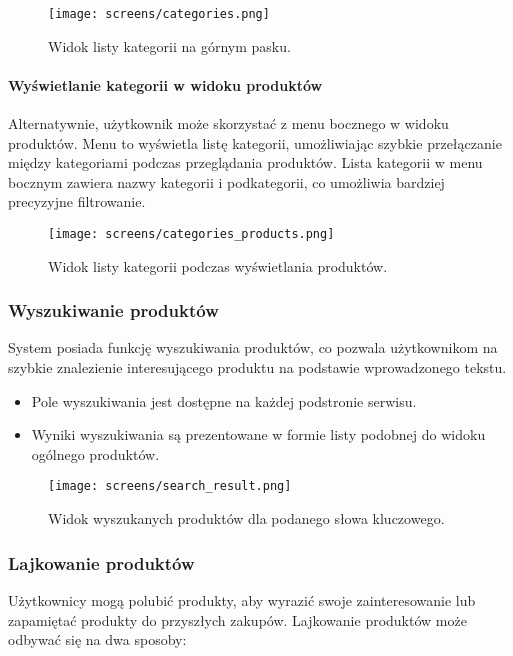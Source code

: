 \documentclass[12pt,a4paper,oneside]{article}
\theoremstyle{definition}
\numberwithin{equation}{section}
\begin{document}
\begin{figure}[H]
    \centering
    \texttt{[image: screens/categories.png]}
    \caption{Widok listy kategorii na górnym pasku.}
    \label{fig:categories_bar}
\end{figure}

\paragraph{Wyświetlanie kategorii w widoku produktów}
Alternatywnie, użytkownik może skorzystać z menu bocznego w widoku produktów. Menu to wyświetla listę kategorii, umożliwiając szybkie przełączanie między kategoriami podczas przeglądania produktów. Lista kategorii w menu bocznym zawiera nazwy kategorii i podkategorii, co umożliwia bardziej precyzyjne filtrowanie.

\begin{figure}[H]
    \centering
    \texttt{[image: screens/categories\_products.png]}
    \caption{Widok listy kategorii podczas wyświetlania produktów.}
    \label{fig:categories}
\end{figure}






\newpage
\subsubsection{Wyszukiwanie produktów}
System posiada funkcję wyszukiwania produktów, co pozwala użytkownikom na szybkie znalezienie interesującego produktu na podstawie wprowadzonego tekstu.
\begin{itemize}
    \item Pole wyszukiwania jest dostępne na każdej podstronie serwisu.
    \item Wyniki wyszukiwania są prezentowane w formie listy podobnej do widoku ogólnego produktów.
\end{itemize}

\begin{figure}[H]
    \centering
    \texttt{[image: screens/search\_result.png]}
    \caption{Widok wyszukanych produktów dla podanego słowa kluczowego.}
    \label{fig:search_products}
\end{figure}






\newpage
\subsubsection{Lajkowanie produktów}
Użytkownicy mogą polubić produkty, aby wyrazić swoje zainteresowanie lub zapamiętać produkty do przyszłych zakupów. Lajkowanie produktów może odbywać się na dwa sposoby:
\end{document}
